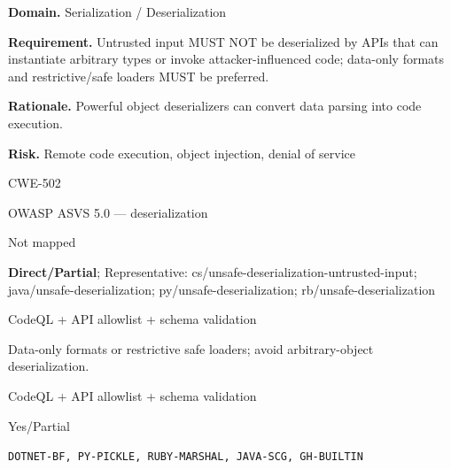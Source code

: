 \documentclass[10pt,letterpaper]{article}
\newcommand{\prioritybadge}[2]{\tcbox[on line,boxrule=0pt,arc=1.2mm,boxsep=0.7mm,left=1mm,right=1mm,top=0.4mm,bottom=0.4mm,colback=#2!12,coltext=#2]{\scriptsize\bfseries #1}}
\begin{document}
\begin{rulebox}[title={\texttt{SCS-ALL-DESER-001} \hfill \prioritybadge{Critical Control}{Critical}}]
\textbf{Domain.} Serialization / Deserialization

\textbf{Requirement.} Untrusted input MUST NOT be deserialized by APIs that can instantiate arbitrary types or invoke attacker-influenced code; data-only formats and restrictive/safe loaders MUST be preferred.

\textbf{Rationale.} Powerful object deserializers can convert data parsing into code execution.

\textbf{Risk.} Remote code execution, object injection, denial of service

\begin{description}[leftmargin=2.65cm,labelwidth=2.3cm,style=nextline,itemsep=1pt,topsep=3pt]
  \item[CWE] CWE-502
  \item[OWASP] OWASP ASVS 5.0 --- deserialization
  \item[CERT] Not mapped
  \item[CodeQL] \textbf{Direct/Partial}; Representative: cs/unsafe-deserialization-untrusted-input; java/unsafe-deserialization; py/unsafe-deserialization; rb/unsafe-deserialization
  \item[Enforcement] CodeQL + API allowlist + schema validation
  \item[Prevention] Data-only formats or restrictive safe loaders; avoid arbitrary-object deserialization.
  \item[Verification] CodeQL + API allowlist + schema validation
  \item[Automation] Yes/Partial
  \item[Sources] \texttt{DOTNET-BF, PY-PICKLE, RUBY-MARSHAL, JAVA-SCG, GH-BUILTIN}
\end{description}
\end{rulebox}
\end{document}
